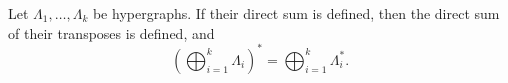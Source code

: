 Let $\Lambda_1, \ldots, \Lambda_k$ be hypergraphs. If their direct sum is defined, then the direct sum of their transposes is defined, and
$$\left( \bigoplus_{i=1}^{k} \Lambda_i \right)^* = \bigoplus_{i=1}^{k} \Lambda_i^*.$$
